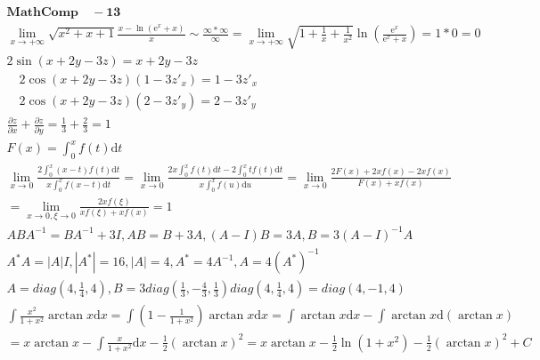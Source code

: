 \documentclass{article}
\begin{document}
\clearpage 
\begin{align*}
    \bm{Math Comp \quad - 13}\\
    \lim_{x \to +\infty} \sqrt{x^2+x+1}\frac{x-\ln(\mathrm{e}^{x}+x)}{x} \sim \frac{\infty * \infty}{\infty}
    = \lim_{x \to +\infty} \sqrt{1+\frac{1}{x}+\frac{1}{x^2}}\ln \left(\frac{\mathrm{e}^{x}}{\mathrm{e}^{x}+x}\right) = 1 * 0 = 0 \\
    2\sin(x+2y-3z) = x+2y-3z \\ 
    \quad 2\cos(x+2y-3z) (1-3z'_{x}) = 1-3z'_{x} \\
    \quad 2\cos(x+2y-3z)(2-3z'_{y}) =2-3z'_{y} \\
    \frac{\partial z}{\partial x} + \frac{\partial z}{\partial y} = \frac{1}{3} + \frac{2}{3} = 1\\ 
    F(x) = \int_{0}^{x} f(t) \mathrm{d}t \\
    \lim_{x \to 0}\frac{2\int_{0}^{x}(x-t)f(t)\mathrm{d}t}{x\int_{0}^{x}f(x-t)\mathrm{d}t} = \lim_{x \to 0} \frac{2x\int_{0}^{x}f(t)\mathrm{d}t-2\int_{0}^{x}tf(t)\mathrm{d}t}{x\int_{0}^{x}f(u)\mathrm{d}u} = \lim_{x \to 0} \frac{2F(x)+2xf(x)-2xf(x)}{F(x)+xf(x)} \\ 
    = \lim_{x \to 0 , \xi \to 0} \frac{2xf(\xi)}{xf(\xi)+xf(x)} = 1 \\
    ABA^{-1} = BA^{-1}+3I , AB = B + 3A , (A-I)B = 3A , B = 3(A-I)^{-1}A \\
    A^{*}A = |A|I , |A^{*}| = 16 , |A| = 4 , A^{*} = 4A^{-1}, A = 4\left(A^{*}\right)^{-1} \\
    A = diag(4,\frac{1}{4},4) , B = 3diag(\frac{1}{3},-\frac{4}{3},\frac{1}{3})diag(4,\frac{1}{4},4) = diag(4,-1,4)\\
    \int \frac{x^2}{1+x^2} \arctan x \mathrm{d}x = \int \left(1-\frac{1}{1+x^2}\right) \arctan x \mathrm{d}x = \int \arctan x\mathrm{d}x - \int \arctan x \mathrm{d}(\arctan x) \\
    = x\arctan x - \int \frac{x}{1+x^2} \mathrm{d}x - \frac{1}{2} (\arctan x)^2 = x\arctan x - \frac{1}{2} \ln(1+x^2) - \frac{1}{2}(\arctan x)^2 + C \\
\end{align*}
\end{document}
